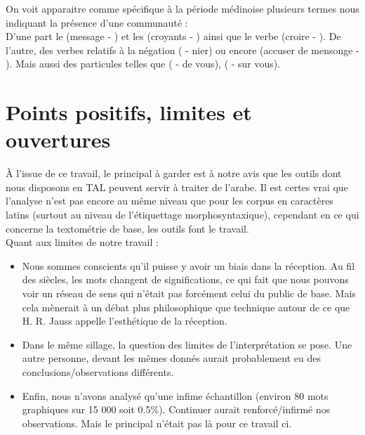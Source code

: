 \documentclass[a4paper,11pt]{report}
\newcommand{\arbt}[1]{{\Large{\arb{#1}}}} %
\begin{document}
On voit apparaitre comme spécifique à la période médinoise plusieurs termes nous indiquant la présence d'une communauté : \\

D'une part le (message - \arbt{رسول}) et les (croyants - \arbt{مؤمن(ون)}) ainsi que le verbe (croire - \arbt{آمن}). De l'autre, des verbes relatifs à la négation (\arbt{كفر} - nier) ou encore (accuser de mensonge - \arbt{كذّب}). Mais aussi des particules telles que (\arbt{منكم} - de vous), (\arbt{عليكم} - sur vous). \\

\chapter{Points positifs, limites et ouvertures}
\label{sec-3}

À l'issue de ce travail, le principal à garder est à notre avis que les outils dont nous disposons en TAL peuvent servir à traiter de l'arabe. Il est certes vrai que l'analyse n'est pas encore au même niveau que pour les corpus en caractères latins (surtout au niveau de l'étiquettage morphosyntaxique), cependant en ce qui concerne la textométrie de base, les outils font le travail. \\

Quant aux limites de notre travail : \\

\begin{itemize}
\item Nous sommes conscients qu'il puisse y avoir un biais dans la réception. Au fil des siècles, les mots changent de significations, ce qui fait que nous pouvons voir un réseau de sens qui n'était pas forcément celui du public de base. Mais cela mènerait à un débat plus philosophique que technique autour de ce que H. R. Jauss appelle l'esthétique de la réception. \\

\item Dans le même sillage, la question des limites de l'interprétation se pose. Une autre personne, devant les mêmes donnés aurait probablement eu des conclusions/observations différents. \\

\item Enfin, nous n'avons analysé qu'une infime échantillon (environ 80 mots graphiques sur 15 000 soit 0.5\%). Continuer aurait renforcé/infirmé nos observations. Mais le principal n'était pas là pour ce travail ci. \\
\end{itemize}
\end{document}
